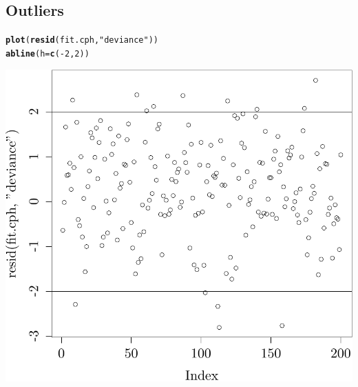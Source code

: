 \documentclass{article}\usepackage[]{graphicx}\usepackage[]{color}
\makeatletter
\def\maxwidth{ %
  \ifdim\Gin@nat@width>\linewidth
    \linewidth
  \else
    \Gin@nat@width
  \fi
}
\newcommand{\hlnum}[1]{\textcolor[rgb]{0.686,0.059,0.569}{#1}}%
\newcommand{\hlstr}[1]{\textcolor[rgb]{0.192,0.494,0.8}{#1}}%
\newcommand{\hlopt}[1]{\textcolor[rgb]{0,0,0}{#1}}%
\newcommand{\hlstd}[1]{\textcolor[rgb]{0.345,0.345,0.345}{#1}}%
\newcommand{\hlkwc}[1]{\textcolor[rgb]{0.333,0.667,0.333}{#1}}%
\newcommand{\hlkwd}[1]{\textcolor[rgb]{0.737,0.353,0.396}{\textbf{#1}}}%
\newenvironment{kframe}{%
 \def\at@end@of@kframe{}%
 \ifinner\ifhmode%
  \def\at@end@of@kframe{\end{minipage}}%
  \begin{minipage}{\columnwidth}%
 \fi\fi%
 \def\FrameCommand##1{\hskip\@totalleftmargin \hskip-\fboxsep
 \colorbox{shadecolor}{##1}\hskip-\fboxsep
     \hskip-\linewidth \hskip-\@totalleftmargin \hskip\columnwidth}%
 \MakeFramed {\advance\hsize-\width
   \@totalleftmargin\z@ \linewidth\hsize
   \@setminipage}}%
 {\par\unskip\endMakeFramed%
 \at@end@of@kframe}
\newenvironment{knitrout}{}{} %
\makeatother
\begin{document}
\subsection{Outliers}
\begin{knitrout}
\color{fgcolor}\begin{kframe}
\begin{alltt}
\hlkwd{plot}\hlstd{(}\hlkwd{resid}\hlstd{(fit.cph,} \hlstr{"deviance"}\hlstd{))}
\hlkwd{abline}\hlstd{(}\hlkwc{h} \hlstd{=} \hlkwd{c}\hlstd{(}\hlopt{-}\hlnum{2}\hlstd{,} \hlnum{2}\hlstd{))}
\end{alltt}
\end{kframe}

{\centering \includegraphics[width=\maxwidth]{figure/05-eda-outliers-1} 

}



\end{knitrout}
\end{document}
